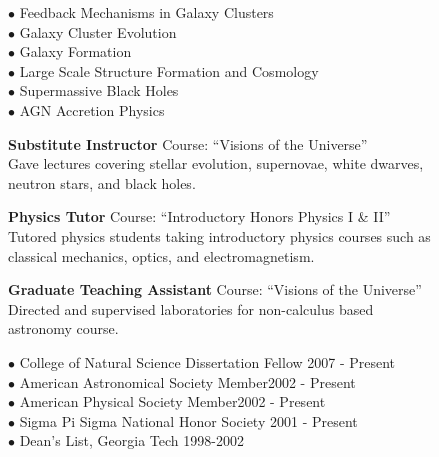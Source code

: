 \documentclass[12pt]{cv}
\begin{document}
\begin{llist}

$\bullet$ Feedback Mechanisms in Galaxy Clusters\\
$\bullet$ Galaxy Cluster Evolution\\
$\bullet$ Galaxy Formation\\
$\bullet$ Large Scale Structure Formation and Cosmology\\
$\bullet$ Supermassive Black Holes\\
$\bullet$ AGN Accretion Physics


{\sc \bf{Substitute Instructor}}
Course: ``Visions of the Universe''\\
Gave lectures covering stellar evolution, supernovae, white dwarves,\\
neutron stars, and black holes.

{\sc \bf{Physics Tutor}}
Course: ``Introductory Honors Physics I \& II''\\
Tutored physics students taking introductory physics courses such as\\
classical mechanics, optics, and electromagnetism.

{\sc \bf{Graduate Teaching Assistant}}
Course: ``Visions of the Universe''\\
Directed and supervised laboratories for non-calculus based\\
astronomy course.



$\bullet$ College of Natural Science Dissertation Fellow \hfill 2007 - Present\\
$\bullet$ American Astronomical Society Member\hfill 2002 - Present\\
$\bullet$ American Physical Society Member\hfill 2002 - Present\\
$\bullet$ Sigma Pi Sigma National Honor Society \hfill 2001 - Present\\
$\bullet$ Dean's List, Georgia Tech \hfill 1998-2002


\end{llist}
\end{document}
